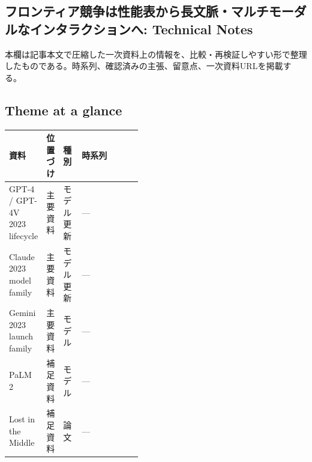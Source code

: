 \subsection*{フロンティア競争は性能表から長文脈・マルチモーダルなインタラクションへ: Technical Notes}
本欄は記事本文で圧縮した一次資料上の情報を、比較・再検証しやすい形で整理したものである。時系列、確認済みの主張、留意点、一次資料URLを掲載する。
\medskip
\subsection*{Theme at a glance}
\begin{center}
\footnotesize
\begin{tabularx}{\linewidth}{@{}p{0.20\linewidth}p{0.10\linewidth}p{0.14\linewidth}X@{}}
\toprule
資料 & 位置づけ & 種別 & 時系列 \\
\midrule
GPT-4 / GPT-4V 2023 lifecycle & 主要資料 & モデル更新 & — \\
Claude 2023 model family & 主要資料 & モデル更新 & — \\
Gemini 2023 launch family & 主要資料 & モデル & — \\
PaLM 2 & 補足資料 & モデル & — \\
Lost in the Middle & 補足資料 & 論文 & — \\
\bottomrule
\end{tabularx}
\end{center}
\normalsize

